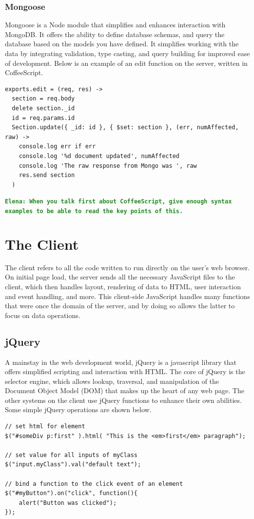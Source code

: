 \documentclass[12pt]{article}
\newcommand{\comment}[1]{{\bf \tt  {#1}}}
\newcommand{\emcomment}[1]{\textcolor{ForestGreen}{\comment{Elena: {#1}}}}
\begin{document}
\subsubsection{Mongoose}\label{sec:mongoose}
Mongoose is a Node module that simplifies and enhances interaction with MongoDB. It offers the ability to define database schemas, and query the database based on the models you have defined. It simplifies working with the data by integrating validation, type casting, and query building for improved ease of development. Below is an example of an edit function on the server, written in CoffeeScript.
\begin{verbatim}
exports.edit = (req, res) ->
  section = req.body
  delete section._id
  id = req.params.id
  Section.update({ _id: id }, { $set: section }, (err, numAffected, raw) ->
    console.log err if err
    console.log '%d document updated', numAffected
    console.log 'The raw response from Mongo was ', raw
    res.send section
  )
\end{verbatim}
\emcomment{When you talk first about CoffeeScript, give enough syntax examples to be able to read the key points of this.}


\section{The Client}\label{sec:client}
The client refers to all the code written to run directly on the user's web browser. On initial page load, the server sends all the necessary JavaScript files to the client, which then handles layout, rendering of data to HTML, user interaction and event handling, and more. This client-side JavaScript handles many functions that were once the domain of the server, and by doing so allows the latter to focus on data operations.

\subsection{jQuery}\label{sec:jquery}
A mainstay in the web development world, jQuery is a javascript library that offers simplified scripting and interaction with HTML. The core of jQuery is the selector engine, which allows lookup, traversal, and manipulation of the Document Object Model (DOM) that makes up the heart of any web page. The other systems on the client use jQuery functions to enhance their own abilities. Some simple jQuery operations are shown below.
\begin{verbatim}
// set html for element
$("#someDiv p:first" ).html( "This is the <em>first</em> paragraph");

// set value for all inputs of myClass
$("input.myClass").val("default text");

// bind a function to the click event of an element
$("#myButton").on("click", function(){
    alert("Button was clicked");
});
\end{verbatim}
\end{document}
